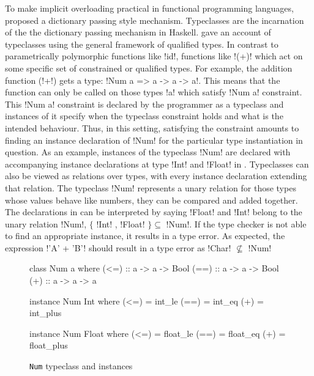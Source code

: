 \documentclass[screen,nonacm]{acmart}
\begin{document}
To make implicit overloading practical in functional programming languages,
\citet{wadler_polymorphism_1989} proposed a dictionary passing style
mechanism. Typeclasses are the incarnation of the the dictionary passing mechanism in
Haskell. \citet{jones_qualified_1994} gave an account of typeclasses using the general
framework of qualified types. In contrast to parametrically polymorphic functions like
!id!, functions like !(+)! which act on some specific set of constrained or qualified
types. For example, the addition function (!+!) gets a type: !Num a => a -> a -> a!. This
means that the function can only be called on those types !a! which satisfy !Num a!
constraint. This !Num a! constraint is declared by the programmer as a typeclass and
instances of it specify when the typeclass constraint holds and what is the intended
behaviour. Thus, in this setting, satisfying the constraint amounts to finding an instance
declaration of !Num! for the particular type instantiation in question. As an example,
instances of the typeclass !Num! are declared with accompanying instance declarations at
type !Int! and !Float! in . Typeclasses can also be viewed as relations
over types, with every instance declaration extending that relation. The typeclass !Num!
represents a unary relation for those types whose values behave like numbers, they can be
compared and added together. The declarations in  can be interpreted by
saying !Float! and !Int! belong to the unary relation !Num!, $\{$ !Int! , !Float! $\}
\subseteq $ !Num!. If the type checker is not able to find an appropriate instance, it
results in a type error. As expected, the expression !'A' + 'B'! should result in a type
error as !Char! $\not\subseteq$ !Num!



\begin{figure}[ht]
\centering
\begin{minipage}[ht]{0.3\linewidth}
\begin{code}
class Num a where
  (<=) :: a -> a -> Bool
  (==) :: a -> a -> Bool
  (+) :: a -> a -> a
\end{code}
\end{minipage}%
\begin{minipage}[ht]{0.3\linewidth}
\begin{code}
instance Num Int where
  (<=) = int_le
  (==) = int_eq
  (+) = int_plus
\end{code}
\end{minipage}%
\begin{minipage}[ht]{0.3\linewidth}
\begin{code}
instance Num Float where
  (<=) = float_le
  (==) = float_eq
  (+) = float_plus
\end{code}
\end{minipage}
\caption{\lstinline{Num} typeclass and instances}
\label{fig:tc-num}
\end{figure}
\end{document}
